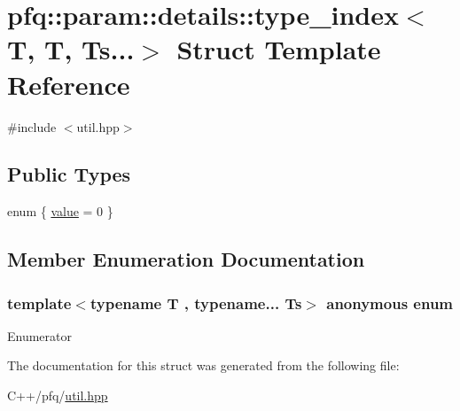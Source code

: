 \hypertarget{structpfq_1_1param_1_1details_1_1type__index_3_01T_00_01T_00_01Ts_8_8_8_4}{\section{pfq\+:\+:param\+:\+:details\+:\+:type\+\_\+index$<$ T, T, Ts...$>$ Struct Template Reference}
\label{structpfq_1_1param_1_1details_1_1type__index_3_01T_00_01T_00_01Ts_8_8_8_4}
}


{\ttfamily \#include $<$util.\+hpp$>$}

\subsection*{Public Types}
\begin{DoxyCompactItemize}
\item 
enum \{ \hyperlink{structpfq_1_1param_1_1details_1_1type__index_3_01T_00_01T_00_01Ts_8_8_8_4_a70bbdf1be503b26289fdb2a8b37a7ff9ac49a13caeb8608e4992f438260249dfa}{value} = 0
 \}
\end{DoxyCompactItemize}


\subsection{Member Enumeration Documentation}
\hypertarget{structpfq_1_1param_1_1details_1_1type__index_3_01T_00_01T_00_01Ts_8_8_8_4_a70bbdf1be503b26289fdb2a8b37a7ff9}{\subsubsection[{anonymous enum}]{\setlength{\rightskip}{0pt plus 5cm}template$<$typename T , typename... Ts$>$ anonymous enum}}\label{structpfq_1_1param_1_1details_1_1type__index_3_01T_00_01T_00_01Ts_8_8_8_4_a70bbdf1be503b26289fdb2a8b37a7ff9}
\begin{Desc}
\item[Enumerator]\par
\begin{description}
\item[{\em 
\hypertarget{structpfq_1_1param_1_1details_1_1type__index_3_01T_00_01T_00_01Ts_8_8_8_4_a70bbdf1be503b26289fdb2a8b37a7ff9ac49a13caeb8608e4992f438260249dfa}{value}\label{structpfq_1_1param_1_1details_1_1type__index_3_01T_00_01T_00_01Ts_8_8_8_4_a70bbdf1be503b26289fdb2a8b37a7ff9ac49a13caeb8608e4992f438260249dfa}
}]\end{description}
\end{Desc}


The documentation for this struct was generated from the following file\+:\begin{DoxyCompactItemize}
\item 
C++/pfq/\hyperlink{util_8hpp}{util.\+hpp}\end{DoxyCompactItemize}
